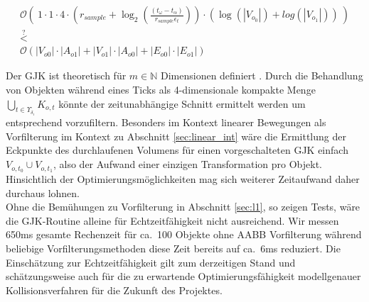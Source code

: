 \begin{gather*}
\mathcal{O}(~1\cdot 1\cdot 4\cdot \left(r_{sample} + \log_{2}\left(\frac{(t_{\omega} - t_\alpha)}{r_{sample}\epsilon_t}\right)\right)\cdot (\log(|V_{o_0}|)+log(|V_{o_1}|))~) \\
\stackrel{?}{<}\\
 \mathcal{O}(|V_{o0}|\cdot  |A_{o1}| + |V_{o1}|\cdot |A_{o0}| + |E_{o0}| \cdot  |E_{o1}|)
\end{gather*}

Der GJK ist theoretisch für $m\in\mathbb{N}$ Dimensionen definiert \cite{gjk}. Durch die Behandlung von Objekten während eines Ticks als 4-dimensionale kompakte Menge $\bigcup_{t \in \Upsilon_{\delta_i}} K_{o,t}$ könnte der zeitunabhängige Schnitt ermittelt werden um entsprechend vorzufiltern. Besonders im Kontext linearer Bewegungen als Vorfilterung im Kontext zu Abschnitt \ref{sec:linear_int} wäre die Ermittlung der Eckpunkte des durchlaufenen Volumens für einen vorgeschalteten GJK einfach $V_{o, t_0} \cup V_{o, t_1}$, also der Aufwand einer einzigen Transformation pro Objekt.\\

Hinsichtlich der Optimierungsmöglichkeiten mag sich weiterer Zeitaufwand daher durchaus lohnen.\\

Ohne die Bemühungen zu Vorfilterung in Abschnitt \ref{sec:l1}, so zeigen Tests, wäre die GJK-Routine alleine für Echtzeitfähigkeit nicht ausreichend. Wir messen 650ms gesamte Rechenzeit für ca.~100 Objekte ohne AABB Vorfilterung während beliebige Vorfilterungsmethoden diese Zeit bereits auf ca.~6ms reduziert. Die Einschätzung zur Echtzeitfähigkeit gilt zum derzeitigen Stand und schätzungsweise auch für die zu erwartende Optimierungsfähigkeit modellgenauer Kollisionsverfahren für die Zukunft des Projektes.